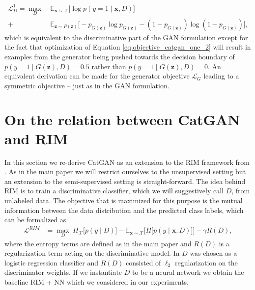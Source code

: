 \documentclass{article} \usepackage{iclr2016_conference,times}
\newcommand{\bx}{\mathbf{x}}
\newcommand{\bz}{\mathbf{z}}
\begin{document}
\begin{appendix}
\begin{equation}
\begin{aligned}
  \mathcal{L}^1_{D} = \max_{D} \  &\mathbb{E}_{\bx \sim \mathcal{X}} \Big[  \log  p(y=1 \mid \bx, D)  \Big]  \\
  + &\mathbb{E}_{\bz \sim P(\bz)} \Big[-p_{G(\bz)} \log p_{G(\bz)} - (1 - p_{G(\bz)}) \log (1 - p_{G(\bz)}) \Big],
\label{eq:objective_catgan_one_2}
\end{aligned}
\end{equation}
which is equivalent to the discriminative part of the GAN formulation
except for the fact that optimization of Equation
\eqref{eq:objective_catgan_one_2} will result in examples from the
generator being pushed towards the decision boundary of
$p(y=1 \mid G(\bz), D) = 0.5$ rather than $p(y=1 \mid G(\bz), D) = 0$.  An
equivalent derivation can be made for the generator objective
$\mathcal{L}_G$ leading to a symmetric objective -- just as in the GAN
formulation.

\section{On the relation between CatGAN and RIM}
\label{sect:relation_catgan_rim}
In this section we re-derive CatGAN as an extension to the RIM
framework from \citet{Krause_2010}. As in the main paper we will
restrict ourselves to the unsupervised setting but an extension to the
semi-supervised setting is straight-forward. The idea behind RIM is to
train a discriminative classifier, which we will suggestively call
$D$, from unlabeled data. The objective that is maximized for this
purpose is the mutual information between the data distribution and
the predicted class labels, which can be formalized as
\begin{equation}
\begin{aligned}
  \mathcal{L}^{RIM} &= \max_{D} \ H_{\mathcal{X}} \Big [ p( y \mid D ) \Big ] - \mathbb{E}_{\bx \sim
                                \mathcal{X}} \Big[ H \big[ p(y
                                 \mid \bx, D) \big]  \Big] - \gamma R(D),
\label{eq:objective_rim}
\end{aligned}
\end{equation}
where the entropy terms are defined as in the main paper and $R(D)$ is
a regularization term acting on the discriminative model. In
\citet{Krause_2010} $D$ was chosen as a logistic regression classifier
and $R(D)$ consisted of $\ell_2$ regularization on the discriminator
weights.  If we instantiate $D$ to be a neural network we obtain the
baseline RIM + NN which we considered in our experiments.


\end{appendix}
\end{document}
